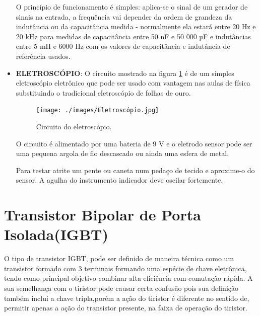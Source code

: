 \documentclass[12pt]{article}
\begin{document}
\begin{itemize}
\begin{figure}[htpb!]
                    \end{figure}

                O princípio de funcionamento é simples: aplica-se o sinal de um gerador de sinais na entrada, a frequência vai depender da ordem de grandeza da indutância ou da capacitância medida - normalmente ela estará entre 20 Hz e 20 kHz para medidas de capacitância entre 50 nF e 50 000 µF e indutâncias entre 5 mH e 6000 Hz com os valores de capacitância e indutância de referência usados.

                \item \textbf{ELETROSCÓPIO}: O circuito mostrado na figura \ref{fig:Eletroscópio} é de um simples eletroscópio eletrônico que pode ser usado com vantagem nas aulas de física substituindo o tradicional eletroscópio de folhas de ouro.
                
                    \begin{figure}[htpb!]
                        
                        \centering
                        \texttt{[image: ./images/Eletroscópio.jpg]}
                        \caption{Circuito do eletroscópio.}
                        \label{fig:Eletroscópio}

                    \end{figure}

                O circuito é alimentado por uma bateria de 9 V e o eletrodo sensor pode ser uma pequena argola de fio descascado ou ainda uma esfera de metal.

                Para testar atrite um pente ou caneta num pedaço de tecido e aproxime-o do sensor. A agulha do instrumento indicador deve oscilar fortemente.

            \end{itemize}

\section{Transistor Bipolar de Porta Isolada(IGBT)}

    O tipo de transistor IGBT, pode ser definido de maneira técnica como um transistor formado com 3 terminais formando uma espécie de chave eletrônica, tendo como principal objetivo combinar alta eficiência com comutação rápida. A sua semelhança com o tiristor pode causar certa confusão pois sua definição também inclui a chave tripla,porém a ação do tiristor é diferente no sentido de, permitir apenas a ação do transistor presente, na faixa de operação do tiristor.
\end{document}

